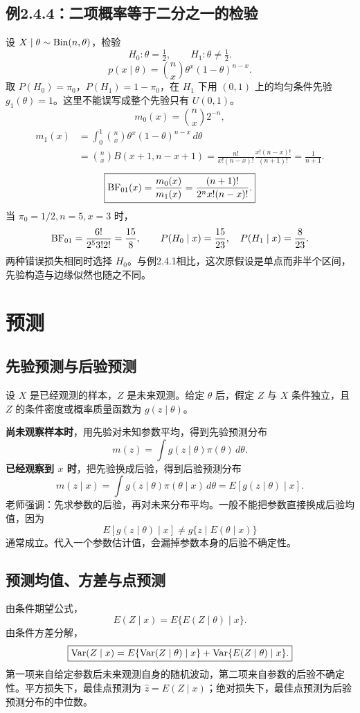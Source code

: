 \subsection{例2.4.4：二项概率等于二分之一的检验}
设 $X\mid\theta\sim\operatorname{Bin}(n,\theta)$，检验
\[
H_0:\theta=\tfrac12,\qquad H_1:\theta\ne\tfrac12.
\]
\[
p(x\mid\theta)=\binom nx\theta^x(1-\theta)^{n-x}.
\]
取 $P(H_0)=\pi_0$，$P(H_1)=1-\pi_0$，在 $H_1$ 下用 $(0,1)$ 上的均匀条件先验 $g_1(\theta)=1$。这里不能误写成整个先验只有 $U(0,1)$。
\[
m_0(x)=\binom nx2^{-n},
\]
\begin{align*}
m_1(x)&=\int_0^1\binom nx\theta^x(1-\theta)^{n-x}\,d\theta\\
&=\binom nx B(x+1,n-x+1)
=\frac{n!}{x!(n-x)!}\frac{x!(n-x)!}{(n+1)!}
=\frac1{n+1}.
\end{align*}
\[
\boxed{\operatorname{BF}_{01}(x)=\frac{m_0(x)}{m_1(x)}
=\frac{(n+1)!}{2^n x!(n-x)!}.}
\]
当 $\pi_0=1/2,n=5,x=3$ 时，
\[
\operatorname{BF}_{01}=\frac{6!}{2^5 3!2!}=\frac{15}{8},\qquad
P(H_0\mid x)=\frac{15}{23},\quad P(H_1\mid x)=\frac8{23}.
\]
两种错误损失相同时选择 $H_0$。与例2.4.1相比，这次原假设是单点而非半个区间，先验构造与边缘似然也随之不同。

\section{预测}
\subsection{先验预测与后验预测}
设 $X$ 是已经观测的样本，$Z$ 是未来观测。给定 $\theta$ 后，假定 $Z$ 与 $X$ 条件独立，且 $Z$ 的条件密度或概率质量函数为 $g(z\mid\theta)$。

\textbf{尚未观察样本时}，用先验对未知参数平均，得到先验预测分布
\[
m(z)=\int g(z\mid\theta)\pi(\theta)\,d\theta.
\]
\textbf{已经观察到 $x$ 时}，把先验换成后验，得到后验预测分布
\[
\boxed{m(z\mid x)=\int g(z\mid\theta)\pi(\theta\mid x)\,d\theta
=E[g(z\mid\theta)\mid x].}
\]
老师强调：先求参数的后验，再对未来分布平均。一般不能把参数直接换成后验均值，因为
\[
E[g(z\mid\theta)\mid x]\ne g\{z\mid E(\theta\mid x)\}
\]
通常成立。代入一个参数估计值，会漏掉参数本身的后验不确定性。

\subsection{预测均值、方差与点预测}
由条件期望公式，
\[
\boxed{E(Z\mid x)=E\{E(Z\mid\theta)\mid x\}.}
\]
由条件方差分解，
\[
\boxed{\operatorname{Var}(Z\mid x)=E\{\operatorname{Var}(Z\mid\theta)\mid x\}
+\operatorname{Var}\{E(Z\mid\theta)\mid x\}.}
\]
第一项来自给定参数后未来观测自身的随机波动，第二项来自参数的后验不确定性。平方损失下，最佳点预测为 $\hat z=E(Z\mid x)$；绝对损失下，最佳点预测为后验预测分布的中位数。

